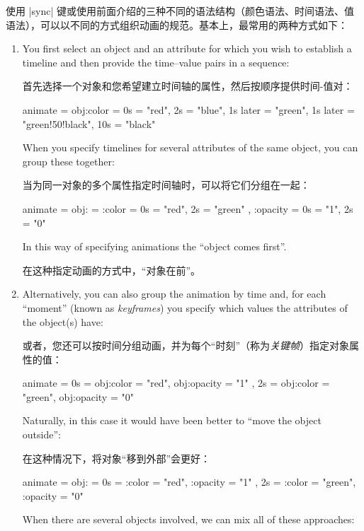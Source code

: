 使用 |sync| 键或使用前面介绍的三种不同的语法结构（颜色语法、时间语法、值语法），可以以不同的方式组织动画的规范。基本上，最常用的两种方式如下：


\begin{enumerate}
    \item You first select an object and an attribute for which you wish to
        establish a timeline and then provide the time--value pairs in a
        sequence:
        
        首先选择一个对象和您希望建立时间轴的属性，然后按顺序提供时间-值对：


\begin{codeexample}
animate = {
  obj:color = {
    0s = "red",
    2s = "blue",
    1s later = "green",
    1s later = "green!50!black",
    10s = "black"
  }
}
\end{codeexample}
        When you specify timelines for several attributes of the same object,
        you can group these together:
        
        当为同一对象的多个属性指定时间轴时，可以将它们分组在一起：
\begin{codeexample}
animate = {
  obj: = {
    :color = { 0s = "red", 2s = "green" },
    :opacity = { 0s = "1", 2s = "0" }
  }
}
\end{codeexample}
        In this way of specifying animations the ``object comes first''.

        在这种指定动画的方式中，“对象在前”。
    \item Alternatively, you can also group the animation by time and, for each
        ``moment'' (known as \emph{keyframes}) you specify which values the
        attributes of the object(s) have:
        
        或者，您还可以按时间分组动画，并为每个“时刻”（称为\emph{关键帧}）指定对象属性的值：
\begin{codeexample}
animate = {
  0s = {
    obj:color = "red",
    obj:opacity = "1"
  },
  2s = {
    obj:color = "green",
    obj:opacity = "0"
  }
}
\end{codeexample}
        Naturally, in this case it would have been better to ``move the object
        outside'':
        
        在这种情况下，将对象“移到外部”会更好：
\begin{codeexample}
animate = {
  obj: = {
    0s = {
      :color = "red",
      :opacity = "1"
    },
    2s = {
      :color = "green",
      :opacity = "0"
    }
  }
}
\end{codeexample}
        When there are several objects involved, we can mix all of these
        approaches:
        

\end{enumerate}
